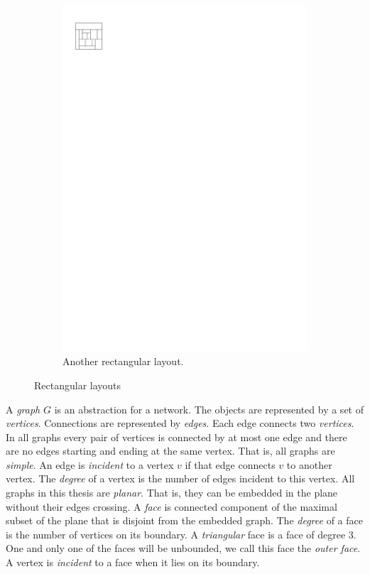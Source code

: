 \begin{figure}
\begin{subfigure}[b]{0.45 \textwidth}
        \includegraphics[scale=1]{rectangularDuals/img/vertonesided}
        \caption{Another rectangular layout.}
        \label{fig:intr:vertonesided}
      \end{subfigure}
      \caption{Rectangular layouts}
      \label{fig:intr:graphs}
  \end{figure}

  A \emph{graph} $G$ is an abstraction for a network. The objects are represented by a set of \emph{vertices}. Connections are represented by \emph{edges}. Each edge connects two \emph{vertices}. In all graphs every pair of vertices is connected by at most one edge and there are no edges starting and ending at the same vertex. That is, all graphs are \emph{simple}. An edge is \emph{incident} to a vertex $v$ if that edge connects $v$ to another vertex. The \emph{degree} of a vertex is the number of edges incident to this vertex.
  All graphs in this thesis are \emph{planar}. That is, they can be embedded in the plane without their edges crossing. A \emph{face} is connected component of the maximal subset of the plane that is disjoint from the embedded graph. The \emph{degree} of a face is the number of vertices on its boundary. A \emph{triangular} face is a face of degree $3$. One and only one of the faces will be unbounded, we call this face the \emph{outer face}.
  A vertex is \emph{incident} to a face when it lies on its boundary.

